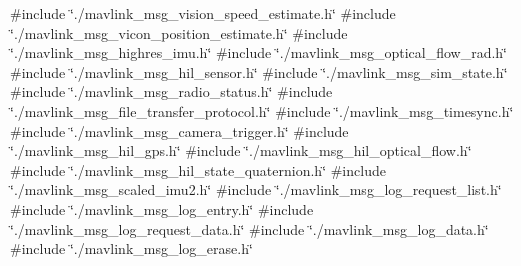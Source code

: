 {\ttfamily \#include \char`\"{}./mavlink\+\_\+msg\+\_\+vision\+\_\+speed\+\_\+estimate.\+h\char`\"{}}\newline
{\ttfamily \#include \char`\"{}./mavlink\+\_\+msg\+\_\+vicon\+\_\+position\+\_\+estimate.\+h\char`\"{}}\newline
{\ttfamily \#include \char`\"{}./mavlink\+\_\+msg\+\_\+highres\+\_\+imu.\+h\char`\"{}}\newline
{\ttfamily \#include \char`\"{}./mavlink\+\_\+msg\+\_\+optical\+\_\+flow\+\_\+rad.\+h\char`\"{}}\newline
{\ttfamily \#include \char`\"{}./mavlink\+\_\+msg\+\_\+hil\+\_\+sensor.\+h\char`\"{}}\newline
{\ttfamily \#include \char`\"{}./mavlink\+\_\+msg\+\_\+sim\+\_\+state.\+h\char`\"{}}\newline
{\ttfamily \#include \char`\"{}./mavlink\+\_\+msg\+\_\+radio\+\_\+status.\+h\char`\"{}}\newline
{\ttfamily \#include \char`\"{}./mavlink\+\_\+msg\+\_\+file\+\_\+transfer\+\_\+protocol.\+h\char`\"{}}\newline
{\ttfamily \#include \char`\"{}./mavlink\+\_\+msg\+\_\+timesync.\+h\char`\"{}}\newline
{\ttfamily \#include \char`\"{}./mavlink\+\_\+msg\+\_\+camera\+\_\+trigger.\+h\char`\"{}}\newline
{\ttfamily \#include \char`\"{}./mavlink\+\_\+msg\+\_\+hil\+\_\+gps.\+h\char`\"{}}\newline
{\ttfamily \#include \char`\"{}./mavlink\+\_\+msg\+\_\+hil\+\_\+optical\+\_\+flow.\+h\char`\"{}}\newline
{\ttfamily \#include \char`\"{}./mavlink\+\_\+msg\+\_\+hil\+\_\+state\+\_\+quaternion.\+h\char`\"{}}\newline
{\ttfamily \#include \char`\"{}./mavlink\+\_\+msg\+\_\+scaled\+\_\+imu2.\+h\char`\"{}}\newline
{\ttfamily \#include \char`\"{}./mavlink\+\_\+msg\+\_\+log\+\_\+request\+\_\+list.\+h\char`\"{}}\newline
{\ttfamily \#include \char`\"{}./mavlink\+\_\+msg\+\_\+log\+\_\+entry.\+h\char`\"{}}\newline
{\ttfamily \#include \char`\"{}./mavlink\+\_\+msg\+\_\+log\+\_\+request\+\_\+data.\+h\char`\"{}}\newline
{\ttfamily \#include \char`\"{}./mavlink\+\_\+msg\+\_\+log\+\_\+data.\+h\char`\"{}}\newline
{\ttfamily \#include \char`\"{}./mavlink\+\_\+msg\+\_\+log\+\_\+erase.\+h\char`\"{}}\newline
